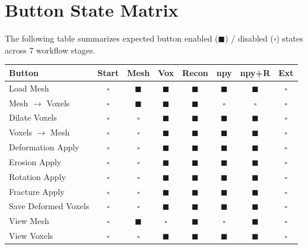 \documentclass[12pt,a4paper]{article}
\begin{document}
\section{Button State Matrix}

The following table summarizes expected button enabled ($\blacksquare$) / disabled ($\square$) states across 7 workflow stages.

{\small
\begin{longtable}{lccccccc}
\toprule
\textbf{Button} & \textbf{Start} & \textbf{Mesh} & \textbf{Vox} & \textbf{Recon} & \textbf{npy} & \textbf{npy+R} & \textbf{Ext} \\
\midrule
Load Mesh                & $\square$ & $\blacksquare$ & $\blacksquare$ & $\blacksquare$ & $\blacksquare$ & $\blacksquare$ & $\square$ \\
Mesh $\rightarrow$ Voxels & $\square$ & $\blacksquare$ & $\blacksquare$ & $\blacksquare$ & $\square$ & $\square$ & $\square$ \\
Dilate Voxels            & $\square$ & $\square$ & $\blacksquare$ & $\blacksquare$ & $\blacksquare$ & $\blacksquare$ & $\square$ \\
Voxels $\rightarrow$ Mesh & $\square$ & $\square$ & $\blacksquare$ & $\blacksquare$ & $\blacksquare$ & $\blacksquare$ & $\square$ \\
Deformation Apply        & $\square$ & $\square$ & $\blacksquare$ & $\blacksquare$ & $\blacksquare$ & $\blacksquare$ & $\square$ \\
Erosion Apply            & $\square$ & $\square$ & $\blacksquare$ & $\blacksquare$ & $\blacksquare$ & $\blacksquare$ & $\square$ \\
Rotation Apply           & $\square$ & $\square$ & $\blacksquare$ & $\blacksquare$ & $\blacksquare$ & $\blacksquare$ & $\square$ \\
Fracture Apply           & $\square$ & $\square$ & $\blacksquare$ & $\blacksquare$ & $\blacksquare$ & $\blacksquare$ & $\square$ \\
Save Deformed Voxels     & $\square$ & $\square$ & $\blacksquare$ & $\blacksquare$ & $\blacksquare$ & $\blacksquare$ & $\square$ \\
View Mesh                & $\square$ & $\blacksquare$ & $\square$ & $\blacksquare$ & $\square$ & $\blacksquare$ & $\square$ \\
View Voxels              & $\square$ & $\square$ & $\blacksquare$ & $\blacksquare$ & $\blacksquare$ & $\blacksquare$ & $\square$ \\

\end{longtable}}
\end{document}
